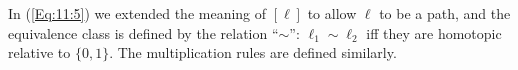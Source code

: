 \begin{remark}
In (\ref{Eq:11:5}) we extended the meaning of $[\ell]$ to allow $\ell$ to be a path, and the equivalence class is defined by the relation ``$\sim$'': $\ell_1\sim \ell_2$ iff they are homotopic relative to $\{0,1\}$. The multiplication rules are defined similarly.
\end{remark}



















